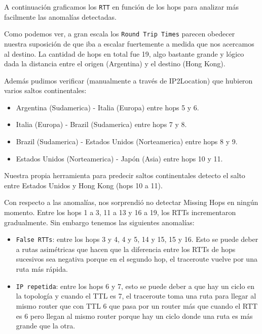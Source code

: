 A continuación graficamos los \texttt{RTT} en función de los hops para analizar más facilmente las anomalías detectadas.

\begin{figure}[H]
    \centering
\end{figure}

Como podemos ver, a gran escala los \texttt{Round Trip Times} parecen obedecer nuestra suposición de que iba a escalar fuertemente a medida que nos acercamos al destino. La cantidad de hops en total fue 19, algo bastante grande y lógico dada la distancia entre el origen (Argentina) y el destino (Hong Kong).

Además pudimos verificar (manualmente a través de IP2Location) que hubieron varios saltos continentales:
\begin{itemize}
\item Argentina (Sudamerica) - Italia (Europa) entre hops 5 y 6.
\item Italia (Europa) - Brazil (Sudamerica) entre hops 7 y 8.
\item Brazil (Sudamerica) - Estados Unidos (Norteamerica) entre hops 8 y 9.
\item Estados Unidos (Norteamerica) - Japón (Asia) entre hops 10 y 11.
\end{itemize}
Nuestra propia herramienta para predecir saltos continentales detecto el salto entre Estados Unidos y Hong Kong (hops 10 a 11).

Con respecto a las anomalías, nos sorprendió no detectar Missing Hops en ningún momento. Entre los hops 1 a 3, 11 a 13 y 16 a 19, los RTTs incrementaron gradualmente. Sin embargo tenemos las siguientes anomalías:

\begin{itemize}
\item \texttt{False RTTs}: entre los hops 3 y 4, 4 y 5, 14 y 15, 15 y 16. Esto se puede deber a rutas asimétricas que hacen que la diferencia entre los RTTs de hops sucesivos sea negativa porque en el segundo hop, el traceroute vuelve por una ruta más rápida.
\item \texttt{IP repetida}: entre los hops 6 y 7, esto se puede deber a que hay un ciclo en la topología y cuando el TTL es 7, el traceroute toma una ruta para llegar al mismo router que con TTL 6 que pasa por un router más que cuando el RTT es 6 pero llegan al mismo router porque hay un ciclo donde una ruta es más grande que la otra.
\end{itemize}
